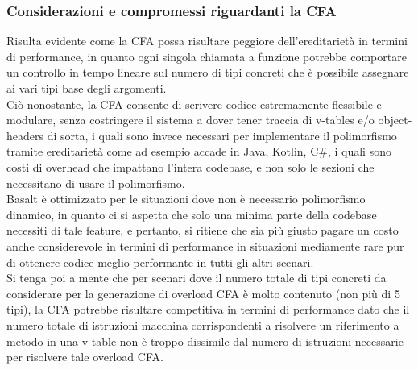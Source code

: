 \subsubsection{Considerazioni e compromessi riguardanti la CFA}
Risulta evidente come la CFA possa risultare peggiore dell'ereditarietà in termini 
di performance, in quanto ogni singola chiamata a funzione potrebbe comportare un controllo 
in tempo lineare sul numero di tipi concreti che è possibile assegnare ai vari tipi base degli argomenti. \\

Ciò nonostante, la CFA consente di scrivere codice estremamente flessibile e modulare, senza 
costringere il sistema a dover tener traccia di v-tables e/o object-headers di sorta, i quali
sono invece necessari per implementare il polimorfismo tramite ereditarietà come ad esempio accade 
in Java, Kotlin, C\#, i quali sono costi di overhead che impattano l'intera codebase, e non solo le sezioni
che necessitano di usare il polimorfismo. \\

Basalt è ottimizzato per le situazioni dove non è necessario polimorfismo dinamico, in quanto ci si aspetta
che solo una minima parte della codebase necessiti di tale feature, e pertanto, si ritiene che sia più giusto
pagare un costo anche considerevole in termini di performance in situazioni mediamente rare pur di ottenere
codice meglio performante in tutti gli altri scenari. \\

Si tenga poi a mente che per scenari dove il numero totale di tipi concreti da considerare 
per la generazione di overload CFA è molto contenuto (non più di 5 tipi), la CFA potrebbe 
risultare competitiva in termini di performance dato che il numero totale di istruzioni macchina
corrispondenti a risolvere un riferimento a metodo in una v-table non è troppo dissimile dal numero 
di istruzioni necessarie per risolvere tale overload CFA. \\